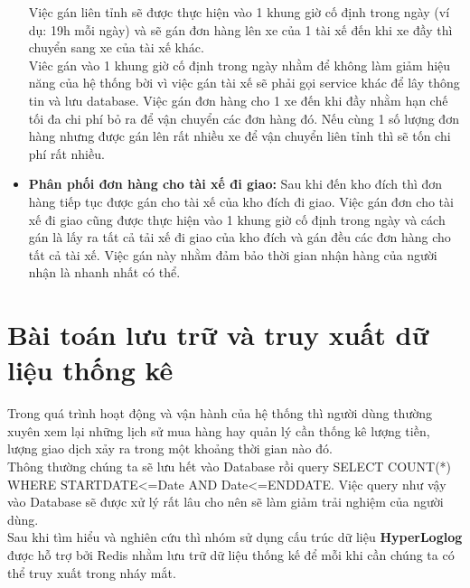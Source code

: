 \begin{itemize}
                Việc gán liên tỉnh sẽ được thực hiện vào 1 khung giờ cố định trong ngày (ví dụ: 19h mỗi ngày) và sẽ gán đơn hàng lên xe của 1 tài xế đến khi xe đầy thì chuyển sang xe của tài xế khác.\\
                
                Viêc gán vào 1 khung giờ cố định trong ngày nhằm để không làm giảm hiệu năng của hệ thống bời vì việc gán tài xế sẽ phải gọi service khác để lây thông tin và lưu database. Việc gán đơn hàng cho 1 xe đến khi đầy nhằm hạn chế tối đa chi phí bỏ ra để vận chuyển các đơn hàng đó. Nếu cùng 1 số lượng đơn hàng nhưng được gán lên rất nhiều xe để vận chuyển liên tỉnh thì sẽ tốn chi phí rất nhiều.
                
                \item \textbf{Phân phối đơn hàng cho tài xế  đi giao:} Sau khi đến kho đích thì đơn hàng tiếp tục được gán cho tài xế của kho đích đi giao. Việc gán đơn cho tài xế đi giao cũng được thực hiện vào 1 khung giờ cố định trong ngày và cách gán là lấy ra tất cả tải xế đi giao của kho đích và gán đều các đơn hàng cho tất cả tài xế. Việc gán này nhằm đảm bảo thời gian nhận hàng của người nhận là nhanh nhất có thể.
                
            \end{itemize}
            
            
            \section{Bài toán lưu trữ và truy xuất dữ liệu thống kê}
                Trong quá trình hoạt động và vận hành của hệ thống thì người dùng thường xuyên xem lại những lịch sử mua hàng hay quản lý cần thống kê lượng tiền, lượng giao dịch xảy ra trong một khoảng thời gian nào đó.\\
                
                Thông thường chúng ta sẽ lưu hết vào Database rồi query SELECT COUNT(*) WHERE STARTDATE<=Date AND Date<=ENDDATE. Việc query như vậy vào Database sẽ được xử lý rất lâu cho nên sẽ làm giảm trải nghiệm của người dùng.\\
                
                Sau khi tìm hiểu và nghiên cứu thì nhóm sử dụng cấu trúc dữ liệu \textbf{HyperLoglog}\cite{hyperloglog} được hỗ trợ bởi Redis nhằm lưu trữ dữ liệu thống kế để mỗi khi cần chúng ta có thể truy xuất trong nháy mắt.\\
                
